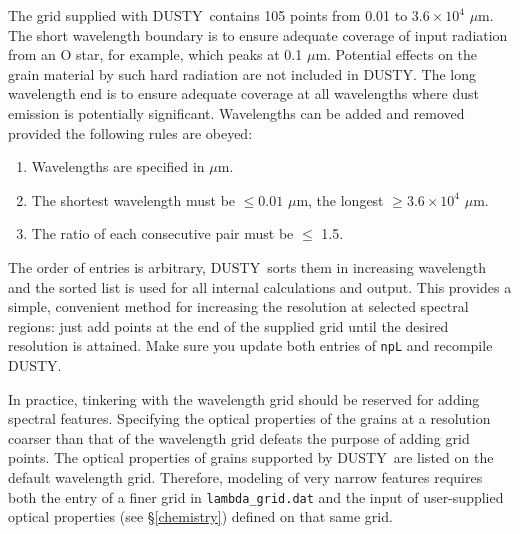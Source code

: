 \documentclass[12pt]{article} \usepackage{epsf}
\def\D  {{\sf DUSTY}}
\def\mic    {\hbox{$\mu$m}}
\begin{document}
The grid supplied with \D\ contains 105 points from 0.01 to $3.6\times10^{4}$
\mic.  The short wavelength boundary is to ensure adequate coverage of input
radiation from an O star, for example, which peaks at 0.1 \mic.  Potential
effects on the grain material by such hard radiation are not included in \D.
The long wavelength end is to ensure adequate coverage at all wavelengths where
dust emission is potentially significant. Wavelengths can be added and removed
provided the following rules are obeyed:
\begin{enumerate}
\item
Wavelengths are specified in \mic.
\item
The shortest wavelength must be $\le 0.01$ \mic, the longest $\ge
3.6\times10^{4}$ \mic.
\item
The ratio of each consecutive pair must be $\le$ 1.5.
\end{enumerate}
The order of entries is arbitrary, \D\ sorts them in increasing wavelength and
the sorted list is used for all internal calculations and output.  This
provides a simple, convenient method for increasing the resolution at selected
spectral regions: just add points at the end of the supplied grid until the
desired resolution is attained.  Make sure you update both entries of {\tt npL}
and recompile \D.

In practice, tinkering with the wavelength grid should be reserved for adding
spectral features. Specifying the optical properties of the grains at a
resolution coarser than that of the wavelength grid defeats the purpose of
adding grid points. The optical properties of grains supported by \D\ are
listed on the default wavelength grid.  Therefore, modeling of very narrow
features requires both the entry of a finer grid in {\tt lambda\_grid.dat} and
the input of user-supplied optical properties (see \S\ref{chemistry}) defined
on that same grid.

\vfil
\end{document}
